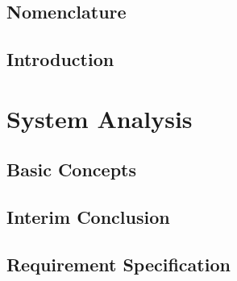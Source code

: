 
\graphicspath{{figures/}}


	






\setcounter{page}{1}
\renewcommand{\thepage}{\Roman{page}}




\setlength\parskip{0ex}
\tableofcontents
\setlength\parskip{1ex}

\chapter*{Nomenclature}\label{chap:acronym}
\printglossary[style=mcoltree,title=Glossary] %
\printglossary[type=\acronymtype,style=glossary2col] %
\printglossary[type=symbols,style=altlong4col] %
\clearpage








\cleardoublepage
\setcounter{page}{1}
\renewcommand{\thepage}{\arabic{page}}

\chapter{Introduction}\label{chap:intro}



\part{System Analysis}\label{part:part1}

\chapter{Basic Concepts}\label{basic_stuff}

\chapter{Interim Conclusion} \label{chap:interim_con}


\chapter{Requirement Specification}\label{chap:reqspec}


